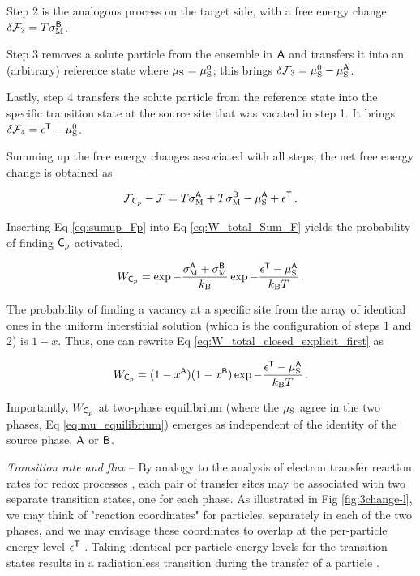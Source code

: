 \documentclass[english,aps,prb,showkeys,reprint]{revtex4-2}
\newcommand{\be}{\begin{equation}}
\newcommand{\ee}{\end{equation}}
\begin{document}
Step 2 is the analogous process on the target side, with a free energy change $\delta \mathcal{F}_2 = T \sigma^{\sf B}_{\rm M}$.

Step 3 removes a solute particle from the ensemble in $\sf A$ and transfers it into an (arbitrary) reference state where $\mu_{\rm S} = \mu^0_{\rm S}$; this brings $\delta \mathcal{F}_3 = \mu^0_{\rm S} - \mu^{\sf A}_{\rm S}$.

Lastly, step 4 transfers the solute particle from the reference state into the specific transition state at the source site that was vacated in step 1. It brings $\delta \mathcal{F}_4 = \epsilon^{\sf T} - \mu^0_{\rm S}$.

Summing up the free energy changes associated with all steps, the net free energy change is obtained as

\be
\label{eq:sumup_Fp}
\mathcal{F}_{{\sf C}_p} - \mathcal{F} = T \sigma^{\sf A}_{\rm M} + T \sigma^{\sf B}_{\rm M} - \mu^{\sf A}_{\rm S} + \epsilon^{\sf T} \,.
\ee

Inserting Eq \ref{eq:sumup_Fp} into Eq \ref{eq:W_total_Sum_F} yields the probability of finding ${\sf C}_p$ activated,

\be
\label{eq:W_total_closed_explicit_first}
W_{{\sf C}_p}
=
\exp - \frac{\sigma^{\sf A}_{\rm M} + \sigma^{\sf B}_{\rm M}} {k_{\rm B}}
\exp - \frac{\epsilon^{\sf T} - \mu^{\sf A}_{\rm S}}{k_{\rm B} T}  \,.
\ee

The probability of finding a vacancy at a specific site from the array of identical ones in the uniform interstitial solution (which is the configuration of steps 1 and 2) is $1 - x$. Thus, one can rewrite Eq \ref{eq:W_total_closed_explicit_first} as \cite{Note1}

\be
\label{eq:W_total_closed_explicit}
W_{{\sf C}_p}
=
(1 - x^{\sf A}) (1 - x^{\sf B})
\exp - \frac{\epsilon^{\sf T} - \mu^{\sf A}_{\rm S}}{k_{\rm B} T}  \,.
\ee

Importantly, $ W_{{\sf C}_p}$ at two-phase equilibrium (where the $\mu_{\rm S}$ agree in the two phases, Eq \ref{eq:mu_equilibrium}) emerges as independent of the identity of the source phase, $\sf A$ or $\sf B$.


\textit{Transition rate and flux}
--
By analogy to the analysis of electron transfer reaction rates for redox processes \cite{BardFaulkner2001}, each pair of transfer sites may be associated with two separate transition states, one for each phase. As illustrated  in Fig \ref{fig:3change-l}, we may think of "reaction coordinates" for particles, separately in each of the two phases, and we may envisage these coordinates to overlap at the per-particle energy level $\epsilon^{\sf T}$ \cite{BardFaulkner2001,VanSanten2009}. Taking identical per-particle energy levels for the transition states results in a radiationless transition during the transfer of a particle \cite{BockrisKhan1993}.
\end{document}
